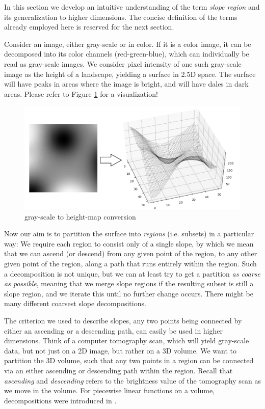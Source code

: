 \documentclass[a4paper,10pt,notitlepage,fullpage]{paper}
\theoremstyle{plain}
\theoremstyle{definition}
\begin{document}
In this section we develop an intuitive understanding of the term \emph{slope region} \cite{kropatsch2019computing} and its generalization to  higher dimensions.
The concise definition of the terms already employed here is reserved for the next section.

Consider an image, either gray-scale or in color.
If it is a color image, it can be decomposed into its color channels (red-green-blue), which can individually be read as gray-scale images.
We consider pixel intensity of one such gray-scale image as the height of a landscape, yielding a surface in 2.5D space.
The surface will have peaks in areas where the image is bright, and will have dales in dark areas.
Please refer to Figure \ref{fig:conversion} for a visualization!

\begin{figure}[h]
\centering
\includegraphics[width=\textwidth*3/4]{img/visu1.png}
\caption{gray-scale to height-map conversion}
\label{fig:conversion}
\end{figure}

Now our aim is to partition the surface into \emph{regions} (i.e. subsets) in a particular way:
We require each region to consist only of a single slope, by which we mean that we can ascend (or descend) from any given point of the region, to any other given point of the region, along a path that runs entirely within the region.
Such a decomposition is not unique, but we can at least try to get a partition \emph{as coarse as possible}, meaning that we merge slope regions if the resulting subset is still a slope region, and we iterate this until no further change occurs.
There might be many different coarsest slope decompositions.

The criterion we used to describe slopes, any two points being connected by either an ascending or a descending path, can easily be used in higher dimensions.
Think of a computer tomography scan, which will yield gray-scale data, but not just on a 2D image, but rather on a 3D volume.
We want to partition the 3D volume, such that any two points in a region can be connected via an either ascending or descending path within the region.
Recall that \emph{ascending} and \emph{descending} refers to the brightness value of the tomography scan as we move in the volume. For piecewise linear functions on a volume, decompositions were introduced in \cite{edelsbrunner2003morse}. 
\end{document}
